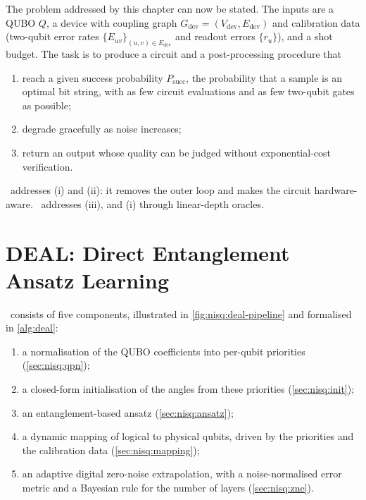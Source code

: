 The problem addressed by this chapter can now be stated. The inputs are a QUBO $Q$, a device with coupling graph $G_{\mathrm{dev}}=(V_{\mathrm{dev}},E_{\mathrm{dev}})$ and calibration data (two-qubit error rates $\{E_{uv}\}_{(u,v)\in E_{\mathrm{dev}}}$ and readout errors $\{r_{u}\}$), and a shot budget. The task is to produce a circuit and a post-processing procedure that
\begin{enumerate}[label=(\roman*)]
\item reach a given success probability $P_{\mathrm{succ}}$, the probability that a sample is an optimal bit string, with as few circuit evaluations and as few two-qubit gates as possible;
\item degrade gracefully as noise increases;
\item return an output whose quality can be judged without exponential-cost verification.
\end{enumerate}
\deal\ addresses (i) and (ii): it removes the outer loop and makes the circuit hardware-aware. \qawa\ addresses (iii), and (i) through linear-depth oracles.

\section{DEAL: Direct Entanglement Ansatz Learning}\label{sec:nisq:deal}

\deal\ consists of five components, illustrated in \cref{fig:nisq:deal-pipeline} and formalised in \cref{alg:deal}:
\begin{enumerate}
\item a normalisation of the QUBO coefficients into per-qubit priorities (\cref{sec:nisq:qpn});
\item a closed-form initialisation of the angles from these priorities (\cref{sec:nisq:init});
\item an entanglement-based ansatz (\cref{sec:nisq:ansatz});
\item a dynamic mapping of logical to physical qubits, driven by the priorities and the calibration data (\cref{sec:nisq:mapping});
\item an adaptive digital zero-noise extrapolation, with a noise-normalised error metric and a Bayesian rule for the number of layers (\cref{sec:nisq:zne}).
\end{enumerate}

